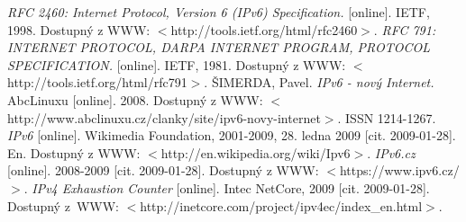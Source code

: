 \documentclass[12pt]{report}
\begin{document}
\begin{thebibliography}{1}
\bibitem{}
	{\em RFC 2460: Internet Protocol, Version 6 (IPv6) Specification.}
	{[online]. IETF, 1998. Dostupný z WWW: $<$http://tools.ietf.org/html/rfc2460$>$.}
\bibitem{}
	{\em RFC 791: INTERNET PROTOCOL, DARPA INTERNET PROGRAM, PROTOCOL SPECIFICATION.}
	{[online]. IETF, 1981. Dostupný z WWW: $<$http://tools.ietf.org/html/rfc791$>$.}
\bibitem{}
	{ŠIMERDA, Pavel.}
	{\em IPv6 - nový Internet.}
	{AbcLinuxu [online]. 2008. Dostupný z WWW: $<$http://www.abclinuxu.cz/clanky/site/ipv6-novy-internet$>$. ISSN 1214-1267.}
\bibitem{}
	{\em IPv6}
	{[online]. Wikimedia Foundation, 2001-2009, 28. ledna 2009 [cit. 2009-01-28]. En. Dostupný z WWW: $<$http://en.wikipedia.org/wiki/Ipv6$>$.}
\bibitem{}
	{\em IPv6.cz}
	{[online]. 2008-2009 [cit. 2009-01-28]. Dostupný z WWW: $<$https://www.ipv6.cz/$>$.}
\bibitem{}
	{\em IPv4 Exhaustion Counter}
	{[online]. Intec NetCore, 2009 [cit. 2009-01-28]. Dostupný z~WWW: $<$http://inetcore.com/project/ipv4ec/index\_en.html$>$.}
\end{thebibliography}
\end{document}

